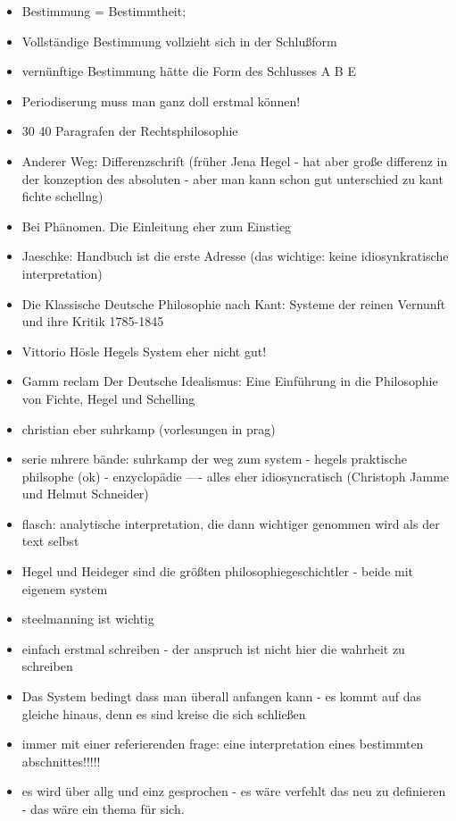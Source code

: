 \documentclass[emulatestandardclasses]{scrartcl}
\begin{document}
\begin{itemize}
  \item Bestimmung = Bestimmtheit; 
  \item Vollständige Bestimmung vollzieht sich in der Schlußform
  \item vernünftige Bestimmung hätte die Form des Schlusses A B E
  \item Periodiserung muss man ganz doll erstmal können!
  \item 30 40 Paragrafen der Rechtsphilosophie
  \item Anderer Weg: Differenzschrift (früher Jena Hegel - hat aber große differenz in der konzeption des absoluten - aber man kann schon gut unterschied zu kant fichte schellng) 
  \item Bei Phänomen. Die Einleitung eher zum Einstieg
  \item Jaeschke: Handbuch ist die erste Adresse (das wichtige: keine idiosynkratische interpretation)
  \item Die Klassische Deutsche Philosophie nach Kant: Systeme der reinen Vernunft und ihre Kritik 1785-1845
  \item Vittorio Hösle Hegels System eher nicht gut!
  \item Gamm reclam Der Deutsche Idealismus: Eine Einführung in die Philosophie von Fichte, Hegel und Schelling 
  \item christian eber suhrkamp (vorlesungen in prag)
  \item serie mhrere bände: suhrkamp der weg zum system - hegels praktische philsophe (ok) - enzyclopädie ---- alles eher idiosyncratisch (Christoph Jamme und Helmut Schneider)
  \item flasch: analytische interpretation, die dann wichtiger genommen wird als der text selbst
  \item Hegel und Heideger sind die größten philosophiegeschichtler - beide mit eigenem system
  \item steelmanning ist wichtig
  \item einfach erstmal schreiben - der anspruch ist nicht hier die wahrheit zu schreiben
  \item Das System bedingt dass man überall anfangen kann - es kommt auf das gleiche hinaus, denn es sind kreise die sich schließen
  \item immer mit einer referierenden frage: eine interpretation eines bestimmten abschnittes!!!!! 
  \item es wird über allg und einz gesprochen - es wäre verfehlt das neu zu definieren - das wäre ein thema für sich. 

\end{itemize}
\end{document}
